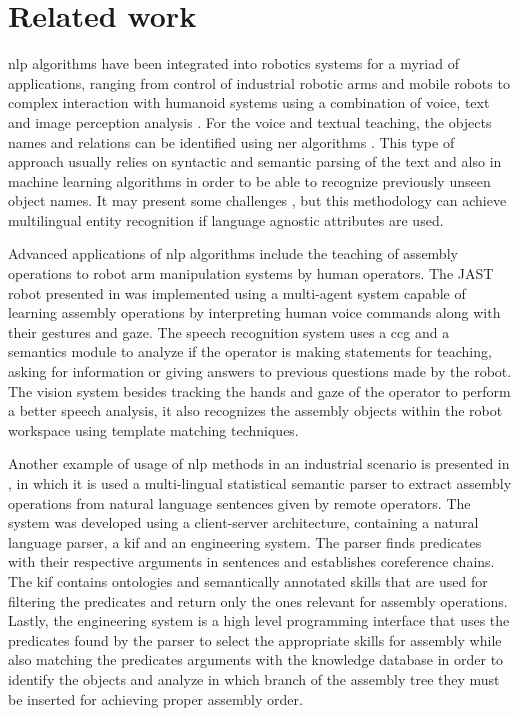 \section{Related work}\label{sec:related-work}

\gls{nlp} algorithms have been integrated into robotics systems for a myriad of applications, ranging from control of industrial robotic arms \cite{Akan2011,Watanabe2006} and mobile robots \cite{Matuszek2013} to complex interaction with humanoid systems using a combination of voice, text and image perception analysis \cite{Neo2008,Barabas2012}. For the voice and textual teaching, the objects names and relations can be identified using \gls{ner} algorithms \cite{Leon2014,Dlugolinsky2013}. This type of approach usually relies on syntactic and semantic parsing of the text and also in machine learning algorithms \cite{Ekbal2012} in order to be able to recognize previously unseen object names. It may present some challenges \cite{Ratinov2009}, but this methodology can achieve multilingual entity recognition \cite{Rami2014} if language agnostic attributes are used.

Advanced applications of \gls{nlp} algorithms include the teaching of assembly operations to robot arm manipulation systems by human operators. The JAST robot presented in \cite{Rickert2007} was implemented using a multi-agent system capable of learning assembly operations by interpreting human voice commands along with their gestures and gaze. The speech recognition system uses a \gls{ccg} and a semantics module to analyze if the operator is making statements for teaching, asking for information or giving answers to previous questions made by the robot. The vision system besides tracking the hands and gaze of the operator to perform a better speech analysis, it also recognizes the assembly objects within the robot workspace using template matching techniques.

Another example of usage of \gls{nlp} methods in an industrial scenario is presented in \cite{Stenmark2013}, in which it is used a multi-lingual statistical semantic parser to extract assembly operations from natural language sentences given by remote operators. The system was developed using a client-server architecture, containing a natural language parser, a \gls{kif} and an engineering system. The parser finds predicates with their respective arguments in sentences and establishes coreference chains. The \gls{kif} contains ontologies and semantically annotated skills that are used for filtering the predicates and return only the ones relevant for assembly operations. Lastly, the engineering system is a high level programming interface that uses the predicates found by the parser to select the appropriate skills for assembly while also matching the predicates arguments with the knowledge database in order to identify the objects and analyze in which branch of the assembly tree they must be inserted for achieving proper assembly order.

